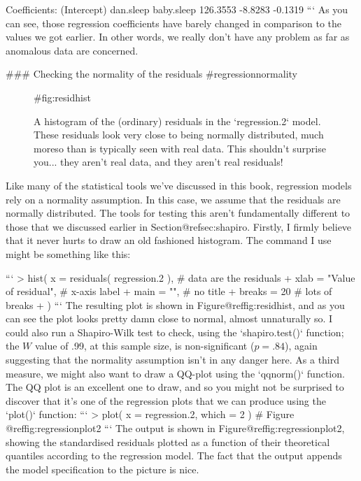 Coefficients:
(Intercept)    dan.sleep   baby.sleep  
   126.3553      -8.8283      -0.1319  
```
As you can see, those regression coefficients have barely changed in comparison to the values we got earlier. In other words, we really don't have any problem as far as anomalous data are concerned.






### Checking the normality of the residuals {#regressionnormality}

\begin{figure}
\begin{center}
\caption{A histogram of the (ordinary) residuals in the `regression.2` model. These residuals look very close to being normally distributed, much moreso than is typically seen with real data. This shouldn't surprise you... they aren't real data, and they aren't real residuals!}
\HR
{#fig:residhist}
\end{center}
\end{figure}


Like many of the statistical tools we've discussed in this book, regression models rely on a normality assumption. In this case, we assume that the residuals are normally distributed. The tools for testing this aren't fundamentally different to those that we discussed earlier in Section@refsec:shapiro. Firstly, I firmly believe that it never hurts to draw an old fashioned histogram. The command I use might be something like this:

```
> hist( x = residuals( regression.2 ),   # data are the residuals
+       xlab = "Value of residual",      # x-axis label
+       main = "",                       # no title 
+       breaks = 20                      # lots of breaks
+ )
```
The resulting plot is shown in Figure@reffig:residhist, and as you can see the plot looks pretty damn close to normal, almost unnaturally so. I could also run a Shapiro-Wilk test  to check, using the `shapiro.test()` function; the $W$ value of .99, at this sample size, is non-significant ($p=.84$), again suggesting that the normality assumption isn't in any danger here. As a third measure, we might also want to draw a QQ-plot using the `qqnorm()` function. The QQ plot is an excellent one to draw, and so you might not be surprised to discover that it's one of the regression plots that we can produce using the `plot()` function:
```
> plot( x = regression.2, which = 2 )   # Figure @ref{fig:regressionplot2}
```
The output is shown in Figure@reffig:regressionplot2, showing the standardised residuals plotted as a function of their theoretical quantiles according to the regression model. The fact that the output appends the model specification to the picture is nice. 

